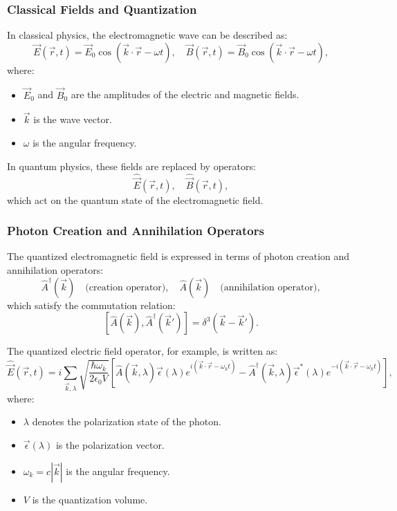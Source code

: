\subsubsection{Classical Fields and Quantization}
In classical physics, the electromagnetic wave can be described as:
\[
\vec{E}(\vec{r}, t) = \vec{E}_0 \cos(\vec{k} \cdot \vec{r} - \omega t),
\quad
\vec{B}(\vec{r}, t) = \vec{B}_0 \cos(\vec{k} \cdot \vec{r} - \omega t),
\]
where:
\begin{itemize}
    \item $\vec{E}_0$ and $\vec{B}_0$ are the amplitudes of the electric and magnetic fields.
    \item $\vec{k}$ is the wave vector.
    \item $\omega$ is the angular frequency.
\end{itemize}

In quantum physics, these fields are replaced by operators:
\[
\hat{\vec{E}}(\vec{r}, t), \quad \hat{\vec{B}}(\vec{r}, t),
\]
which act on the quantum state of the electromagnetic field.

\subsubsection{Photon Creation and Annihilation Operators}
The quantized electromagnetic field is expressed in terms of photon creation and annihilation operators:
\[
\hat{A}^\dagger(\vec{k}) \quad \text{(creation operator)},
\quad
\hat{A}(\vec{k}) \quad \text{(annihilation operator)},
\]
which satisfy the commutation relation:
\[
[\hat{A}(\vec{k}), \hat{A}^\dagger(\vec{k}')] = \delta^3(\vec{k} - \vec{k}').
\]

The quantized electric field operator, for example, is written as:
\[
\hat{\vec{E}}(\vec{r}, t) = i \sum_{\vec{k}, \lambda} \sqrt{\frac{\hbar \omega_k}{2 \epsilon_0 V}}
\left[
\hat{A}(\vec{k}, \lambda) \vec{\epsilon}(\lambda) e^{i (\vec{k} \cdot \vec{r} - \omega_k t)} 
- \hat{A}^\dagger(\vec{k}, \lambda) \vec{\epsilon}^*(\lambda) e^{-i (\vec{k} \cdot \vec{r} - \omega_k t)}
\right],
\]
where:
\begin{itemize}
    \item $\lambda$ denotes the polarization state of the photon.
    \item $\vec{\epsilon}(\lambda)$ is the polarization vector.
    \item $\omega_k = c |\vec{k}|$ is the angular frequency.
    \item $V$ is the quantization volume.
\end{itemize}

